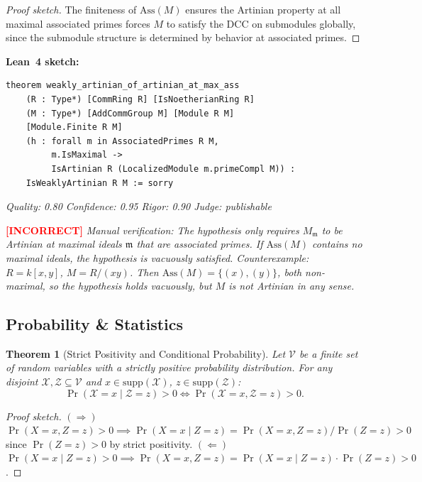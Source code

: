 \documentclass[11pt,a4paper]{article}
\newtheorem{theorem}{Theorem}
\begin{document}
\begin{proof}[Proof sketch]
The finiteness of $\mathrm{Ass}(M)$ ensures the Artinian property at all maximal associated primes forces $M$ to satisfy the DCC on submodules globally, since the submodule structure is determined by behavior at associated primes.
\end{proof}

\noindent\textbf{Lean~4 sketch:}
\begin{verbatim}
theorem weakly_artinian_of_artinian_at_max_ass
    (R : Type*) [CommRing R] [IsNoetherianRing R]
    (M : Type*) [AddCommGroup M] [Module R M]
    [Module.Finite R M]
    (h : forall m in AssociatedPrimes R M,
         m.IsMaximal ->
         IsArtinian R (LocalizedModule m.primeCompl M)) :
    IsWeaklyArtinian R M := sorry
\end{verbatim}

\medskip
\noindent\emph{Quality: 0.80 \quad Confidence: 0.95 \quad Rigor: 0.90 \quad Judge: publishable}

\noindent\textcolor{red}{\textbf{[INCORRECT]}} \emph{Manual verification: The hypothesis only requires $M_\mathfrak{m}$ to be Artinian at maximal ideals $\mathfrak{m}$ that are associated primes. If $\mathrm{Ass}(M)$ contains no maximal ideals, the hypothesis is vacuously satisfied. Counterexample: $R = k[x,y]$, $M = R/(xy)$. Then $\mathrm{Ass}(M) = \{(x), (y)\}$, both non-maximal, so the hypothesis holds vacuously, but $M$ is not Artinian in any sense.}


\subsection{Probability \& Statistics}

\begin{theorem}[Strict Positivity and Conditional Probability]
\label{thm:strict_pos_cond}
Let $\mathcal{V}$ be a finite set of random variables with a strictly positive probability distribution. For any disjoint $\mathcal{X}, \mathcal{Z} \subseteq \mathcal{V}$ and $x \in \mathrm{supp}(\mathcal{X})$, $z \in \mathrm{supp}(\mathcal{Z})$:
\[
\Pr(\mathcal{X}{=}x \mid \mathcal{Z}{=}z) > 0 \iff \Pr(\mathcal{X}{=}x, \mathcal{Z}{=}z) > 0.
\]
\end{theorem}

\begin{proof}[Proof sketch]
$(\Rightarrow)$~$\Pr(X{=}x, Z{=}z) > 0 \implies \Pr(X{=}x \mid Z{=}z) = \Pr(X{=}x,Z{=}z)/\Pr(Z{=}z) > 0$ since $\Pr(Z{=}z) > 0$ by strict positivity.
$(\Leftarrow)$~$\Pr(X{=}x \mid Z{=}z) > 0 \implies \Pr(X{=}x,Z{=}z) = \Pr(X{=}x \mid Z{=}z) \cdot \Pr(Z{=}z) > 0$.
\end{proof}
\end{document}
